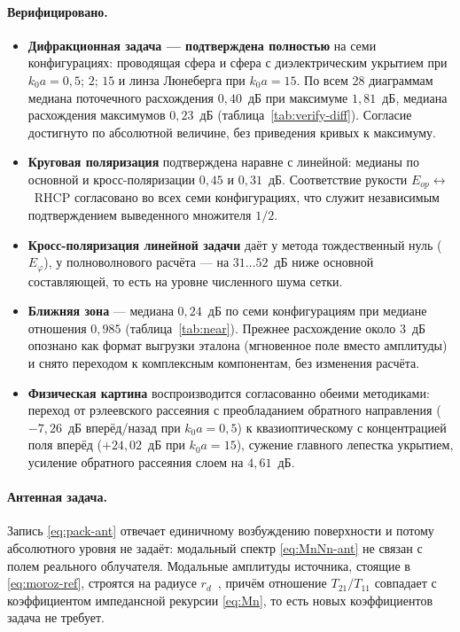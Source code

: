 \documentclass[11pt,a4paper]{article}
\begin{document}
\paragraph{Верифицировано.}
\begin{itemize}
  \item \textbf{Дифракционная задача --- подтверждена полностью} на семи
        конфигурациях: проводящая сфера и сфера с диэлектрическим укрытием при
        $k_0a = 0{,}5$; $2$; $15$ и линза Люнеберга при $k_0a = 15$.
        По всем 28 диаграммам медиана поточечного расхождения $0{,}40$~дБ при
        максимуме $1{,}81$~дБ, медиана расхождения максимумов $0{,}23$~дБ
        (таблица~\ref{tab:verify-diff}). Согласие достигнуто по абсолютной величине,
        без приведения кривых к максимуму.
  \item \textbf{Круговая поляризация} подтверждена наравне с линейной: медианы по
        основной и кросс-поляризации $0{,}45$ и $0{,}31$~дБ. Соответствие рукости
        $E_{op}\leftrightarrow$~RHCP согласовано во всех семи конфигурациях, что
        служит независимым подтверждением выведенного множителя $1/2$.
  \item \textbf{Кросс-поляризация линейной задачи} даёт у метода тождественный нуль
        ($E_\varphi$), у полноволнового расчёта --- на $31\ldots52$~дБ ниже
        основной составляющей, то есть на уровне численного шума сетки.
  \item \textbf{Ближняя зона} --- медиана $0{,}24$~дБ по семи конфигурациям при
        медиане отношения $0{,}985$ (таблица~\ref{tab:near}). Прежнее расхождение
        около $3$~дБ опознано как формат выгрузки эталона (мгновенное поле вместо
        амплитуды) и снято переходом к комплексным компонентам, без изменения
        расчёта.
  \item \textbf{Физическая картина} воспроизводится согласованно обеими методиками:
        переход от рэлеевского рассеяния с преобладанием обратного направления
        ($-7{,}26$~дБ вперёд/назад при $k_0a = 0{,}5$) к квазиоптическому с
        концентрацией поля вперёд ($+24{,}02$~дБ при $k_0a = 15$), сужение главного
        лепестка укрытием, усиление обратного рассеяния слоем на $4{,}61$~дБ.
\end{itemize}

\paragraph{Антенная задача.}
Запись \eqref{eq:pack-ant} отвечает единичному возбуждению поверхности и потому
абсолютного уровня не задаёт: модальный спектр \eqref{eq:MnNn-ant} не связан с
полем реального облучателя. Модальные амплитуды источника, стоящие в
\eqref{eq:moroz-ref}, строятся на радиусе $r_d$~\cite{moroz2005,li1994,chew1976},
причём отношение $T_{21}/T_{11}$ совпадает с коэффициентом импедансной рекурсии
\eqref{eq:Mn}, то есть новых коэффициентов задача не требует.
\end{document}
